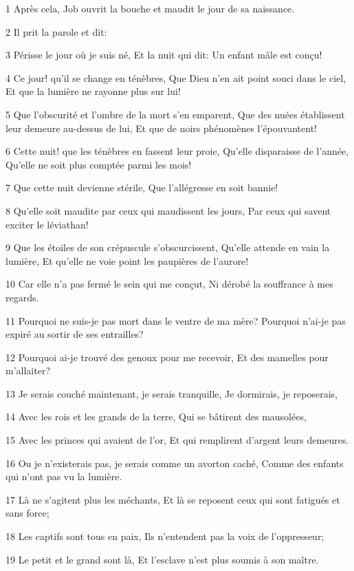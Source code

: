\par 1 Après cela, Job ouvrit la bouche et maudit le jour de sa naissance.
\par 2 Il prit la parole et dit:
\par 3 Périsse le jour où je suis né, Et la nuit qui dit: Un enfant mâle est conçu!
\par 4 Ce jour! qu'il se change en ténèbres, Que Dieu n'en ait point souci dans le ciel, Et que la lumière ne rayonne plus sur lui!
\par 5 Que l'obscurité et l'ombre de la mort s'en emparent, Que des nuées établissent leur demeure au-dessus de lui, Et que de noirs phénomènes l'épouvantent!
\par 6 Cette nuit! que les ténèbres en fassent leur proie, Qu'elle disparaisse de l'année, Qu'elle ne soit plus comptée parmi les mois!
\par 7 Que cette nuit devienne stérile, Que l'allégresse en soit bannie!
\par 8 Qu'elle soit maudite par ceux qui maudissent les jours, Par ceux qui savent exciter le léviathan!
\par 9 Que les étoiles de son crépuscule s'obscurcissent, Qu'elle attende en vain la lumière, Et qu'elle ne voie point les paupières de l'aurore!
\par 10 Car elle n'a pas fermé le sein qui me conçut, Ni dérobé la souffrance à mes regards.
\par 11 Pourquoi ne suis-je pas mort dans le ventre de ma mère? Pourquoi n'ai-je pas expiré au sortir de ses entrailles?
\par 12 Pourquoi ai-je trouvé des genoux pour me recevoir, Et des mamelles pour m'allaiter?
\par 13 Je serais couché maintenant, je serais tranquille, Je dormirais, je reposerais,
\par 14 Avec les rois et les grands de la terre, Qui se bâtirent des mausolées,
\par 15 Avec les princes qui avaient de l'or, Et qui remplirent d'argent leurs demeures.
\par 16 Ou je n'existerais pas, je serais comme un avorton caché, Comme des enfants qui n'ont pas vu la lumière.
\par 17 Là ne s'agitent plus les méchants, Et là se reposent ceux qui sont fatigués et sans force;
\par 18 Les captifs sont tous en paix, Ils n'entendent pas la voix de l'oppresseur;
\par 19 Le petit et le grand sont là, Et l'esclave n'est plus soumis à son maître.
